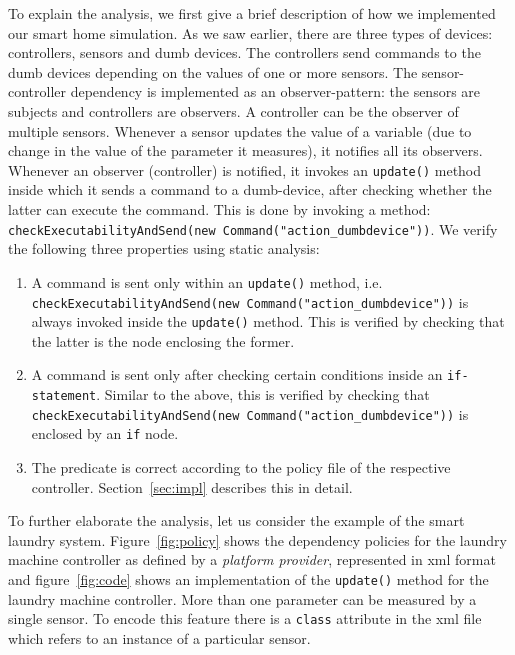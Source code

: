 \documentclass{article}
\begin{document}
To explain the analysis, we first give a brief description of how we implemented our smart home simulation. As we saw earlier, there are three types of devices: controllers, sensors and dumb devices. The controllers send commands to the dumb devices depending on the values of one or more sensors. The sensor-controller dependency is implemented as an observer-pattern: the sensors are subjects and controllers are observers. A controller can be the observer of multiple sensors. Whenever a sensor updates the value of a variable (due to change in the value of the parameter it measures), it notifies all its observers. Whenever an observer (controller) is notified, it invokes an \texttt{update()} method inside which it sends a command to a dumb-device, after checking whether the latter can execute the command. This is done by invoking a method: \texttt{checkExecutabilityAndSend(new Command("action\_dumbdevice"))}. 
We verify the following three properties using static analysis:
\begin{enumerate}[topsep=0pt,itemsep=-1ex,partopsep=1ex,parsep=1ex]
    \item A command is sent only within an \texttt{update()} method, i.e. \\
    \texttt{checkExecutabilityAndSend(new Command("action\_dumbdevice"))} is always invoked inside the \texttt{update()} method. This is verified by checking that the latter is the node enclosing the former.
    \item A command is sent only after checking certain conditions inside an \texttt{if-statement}. Similar to the above, this is verified by checking that \texttt{checkExecutabilityAndSend(new Command("action\_dumbdevice"))} is enclosed by an \texttt{if} node.
    \item The predicate is correct according to the policy file of the respective controller. Section~\ref{sec:impl} describes this in detail.\\
\end{enumerate}

To further elaborate the analysis, let us consider the example of the smart laundry system. Figure~\ref{fig:policy} shows the dependency policies for the laundry machine controller as defined by a \textit{platform provider}, represented in xml format and figure~\ref{fig:code} shows an implementation of the \texttt{update()} method for the laundry machine controller. More than one parameter can be measured by a single sensor. To encode this feature there is a \texttt{class} attribute in the xml file which refers to an instance of a particular sensor.\\
\end{document}
